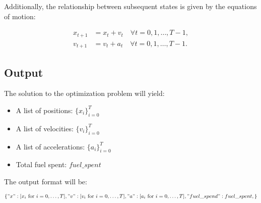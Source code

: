 \documentclass{article}
\begin{document}
Additionally, the relationship between subsequent states is given by the equations of motion:

\begin{align}
    x_{t+1} &= x_t + v_t \quad \forall t = 0, 1, \dots, T-1, \\
    v_{t+1} &= v_t + a_t \quad \forall t = 0, 1, \dots, T-1.
\end{align}

\subsection*{Output}
The solution to the optimization problem will yield:

\begin{itemize}
    \item A list of positions: \(\{x_i\}_{i=0}^{T}\)
    \item A list of velocities: \(\{v_i\}_{i=0}^{T}\)
    \item A list of accelerations: \(\{a_i\}_{i=0}^{T}\)
    \item Total fuel spent: \(fuel\_spent\)
\end{itemize}

The output format will be:

\[
\{
    "x": [x_i \text{ for } i = 0, \ldots, T],
    "v": [v_i \text{ for } i = 0, \ldots, T],
    "a": [a_i \text{ for } i = 0, \ldots, T],
    "fuel\_spend": fuel\_spent,
\}
\]
\end{document}
